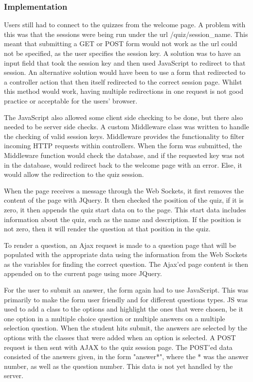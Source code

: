 \subsubsection{Implementation}
Users still had to connect to the quizzes from the welcome page. A problem with this was that the sessions were being run under the url /quiz/session\_name. This meant that submitting a GET or POST form would not work as the url could not be specified, as the user specifies the session key. A solution was to have an input field that took the session key and then used JavaScript to redirect to that session. An alternative solution would have been to use a form that redirected to a controller action that then itself redirected to the correct session page. Whilst this method would work, having multiple redirections in one request is not good practice or acceptable for the users' browser.

The JavaScript also allowed some client side checking to be done, but there also needed to be server side checks. A custom Middleware class was written to handle the checking of valid session keys. Middleware provides the functionality to filter incoming HTTP requests within controllers\cite{laravel-middleware}. When the form was submitted, the Middleware function would check the database, and if the requested key was not in the database, would redirect back to the welcome page with an error. Else, it would allow the redirection to the quiz session.

When the page receives a message through the Web Sockets, it first removes the content of the page with JQuery. It then checked the position of the quiz, if it is zero, it then appends the quiz start data on to the page. This start data includes information about the quiz, such as the name and description. If the position is not zero, then it will render the question at that position in the quiz.

To render a question, an Ajax request is made to a question page that will be populated with the appropriate data using the information from the Web Sockets as the variables for finding the correct question. The Ajax'ed page content is then appended on to the current page using more JQuery.

For the user to submit an answer, the form again had to use JavaScript. This was primarily to make the form user friendly and for different questions types. JS was used to add a class to the options and highlight the ones that were chosen, be it one option in a multiple choice question or multiple answers on a multiple selection question. When the student hits submit, the answers are selected by the options with the classes that were added when an option is selected. A POST request is then sent with AJAX to the quiz session page. The POST'ed data consisted of the answers given, in the form "answer*", where the * was the answer number, as well as the question number. This data is not yet handled by the server.


